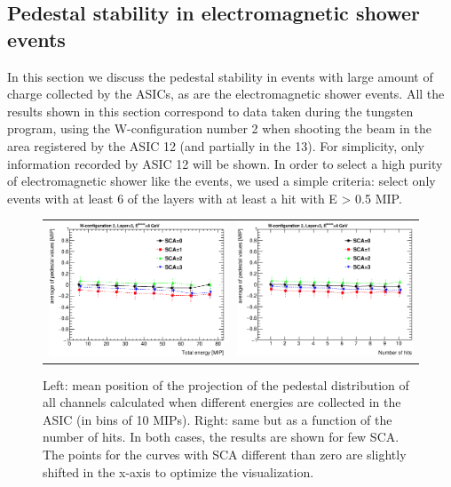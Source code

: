 \documentclass[a4paper,11pt]{article}
\begin{document}
\subsection{Pedestal stability in electromagnetic shower events}
\label{sec:showers}

In this section we discuss the pedestal stability in events with large amount of charge collected by the ASICs, as are the 
electromagnetic shower events. All the results shown in this section correspond to data taken during the tungsten program, 
using the W-configuration number 2 when shooting the beam in the area registered by the ASIC 12 (and partially in the 13). 
For simplicity, only information recorded by ASIC 12 will be shown. 
In order to select a high purity of
electromagnetic shower like the events, 
we used a simple criteria: select only events with at least 6 of the layers with at least a hit with E > 0.5 MIP.

\begin{figure}[!ht]
  \centering 
    \begin{tabular}{ll}
      \includegraphics[width=2.8in]{../figs/pedestal/pedestal_vs_energy_shower.eps} & \includegraphics[width=2.8in]{../figs/pedestal/pedestal_vs_nhits_shower.eps} \\
    \end{tabular}
    \caption{Left: mean position of the projection of the pedestal distribution of all channels
      calculated when different energies are collected in the ASIC (in bins of 10 MIPs).
      Right: same but as a function of the number of hits. In both cases, the results are shown for few SCA.
      The points for the curves with SCA different than zero are slightly shifted in the x-axis to optimize the visualization.}
\label{pedestal_shower_1}
\end{figure}
\end{document}
